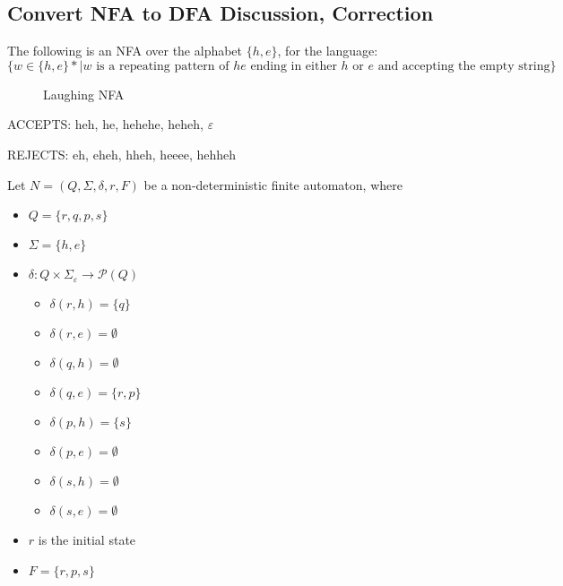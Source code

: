 \documentclass[11pt]{article}
\begin{document}
\newpage
\subsection{Convert NFA to DFA Discussion, Correction}
The following is an NFA over the alphabet $\{h,e\}$, for the language:
$$\{w \in \{h,e\}\ast | w \text{ is a repeating pattern of } he \text{ ending in
either } h \text{ or } e \text{ and accepting the empty string}\}$$

\begin{figure}[H]
	\centering
	\caption{Laughing NFA}
	\label{fig:laughingnfacorrected}
\end{figure}

ACCEPTS: heh, he, hehehe, heheh, $\varepsilon$

REJECTS: eh, eheh, hheh, heeee, hehheh

Let $N=(Q,\Sigma,\delta,r,F)$ be a non-deterministic finite automaton, where

\begin{itemize}
	\item[] $Q = \{r, q, p, s\}$
	\item[] $\Sigma = \{h, e\}$
	\item[] $\delta : Q \times \Sigma_\varepsilon \to \mathcal{P}(Q)$
		\begin{itemize}
			\item[] $\delta(r,h)=\{q\}$
			\item[] $\delta(r,e)=\emptyset$
			\item[] $\delta(q,h)=\emptyset$
			\item[] $\delta(q,e)=\{r, p\}$
			\item[] $\delta(p,h)=\{s\}$
			\item[] $\delta(p,e)=\emptyset$
			\item[] $\delta(s,h)=\emptyset$
			\item[] $\delta(s,e)=\emptyset$
		\end{itemize}
	\item[] $r$ is the initial state
	\item[] $F = \{r, p, s\}$
\end{itemize}
\end{document}
